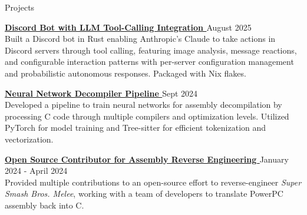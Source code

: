 \documentclass{resume}
\newcommand{\scaledfaExternalLink}{\raisebox{0.1\height}{\scalebox{0.7}{\faExternalLink*}}}
\begin{document}
\begin{rSection}{Projects}

\item{} {\bf{}
    \href{https://github.com/wyatt-avilla/claude-discord-bot}{Discord
  Bot with LLM Tool-Calling Integration \scaledfaExternalLink}}
  {\hfill{} August 2025} \\
  Built a Discord bot in Rust enabling Anthropic's Claude to take
  actions in Discord servers through tool calling, featuring image
  analysis, message reactions, and configurable interaction patterns
  with per-server configuration management and probabilistic
  autonomous responses. Packaged with Nix flakes.

\item{} {\bf{} \href{https://github.com/wyatt-avilla/sunbird}{Neural
  Network Decompiler Pipeline \scaledfaExternalLink}} {\hfill{} Sept 2024} \\
  Developed a pipeline to train neural networks for assembly
  decompilation by processing C code through multiple compilers and
  optimization levels. Utilized PyTorch for model training and
  Tree-sitter for efficient tokenization and vectorization.

\item{} {\bf{}
    \href{https://github.com/search?q=repo\%3Adoldecomp\%2Fmelee++author\%3Awyatt-avilla&type=pullrequests&ref=advsearch}{Open
      Source Contributor for
  Assembly Reverse Engineering \scaledfaExternalLink}} {\hfill{}
  January 2024 - April 2024} \\
  Provided multiple contributions to an open-source effort to reverse-engineer
  \textit{Super Smash Bros. Melee}, working with a team of developers
  to translate PowerPC
  assembly back into C.

\end{rSection}
\end{document}
